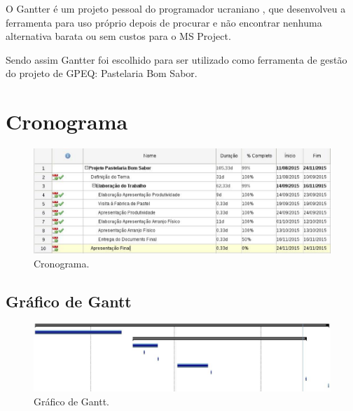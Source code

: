 O Gantter é um projeto pessoal do programador ucraniano \cite{VMazepa}, que desenvolveu a ferramenta para uso próprio depois de procurar e não encontrar nenhuma alternativa barata ou sem custos para o MS Project.

Sendo assim Gantter foi escolhido para ser utilizado como ferramenta de gestão do projeto de GPEQ: Pastelaria Bom Sabor.

\section{Cronograma}

\begin{figure}[H]
    \centering
  \includegraphics[keepaspectratio=true,scale=0.5]{figuras/cronograma.eps}
    \caption{Cronograma.}
    \label{fig:cronograma}
\end{figure}

\subsection{Gráfico de Gantt}

\begin{figure}[H]
    \centering
  \includegraphics[keepaspectratio=true,scale=0.5]{figuras/grafico_gantt.eps}
    \caption{Gráfico de Gantt.}
    \label{fig:grafico_gantt}
\end{figure}
